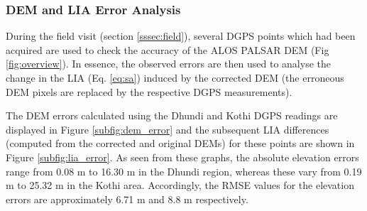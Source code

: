 \documentclass[12pt]{elsarticle}
\numberwithin{equation}{section}
\numberwithin{figure}{section}
\numberwithin{table}{section}
\begin{document}
\subsubsection{DEM and LIA Error Analysis}
\label{sssec:error}

During the field visit (section \ref{sssec:field}), several DGPS points which had been acquired are used to check the accuracy of the ALOS PALSAR DEM (Fig \ref{fig:overview}). In essence, the observed errors are then used to analyse the change in the LIA (Eq. \eqref{eq:sa}) induced by the corrected DEM (the erroneous DEM pixels are replaced by the respective DGPS measurements). 

The DEM errors calculated using the Dhundi and Kothi DGPS readings are displayed in Figure \ref{subfig:dem_error} and the subsequent LIA differences (computed from the corrected and original DEMs) for these points are shown in Figure \ref{subfig:lia_error}. As seen from these graphs, the absolute elevation errors range from 0.08 m to 16.30 m in the Dhundi region, whereas these vary from 0.19 m to 25.32 m in the Kothi area. Accordingly, the RMSE values for the elevation errors are approximately 6.71 m and 8.8 m respectively.
\end{document}
